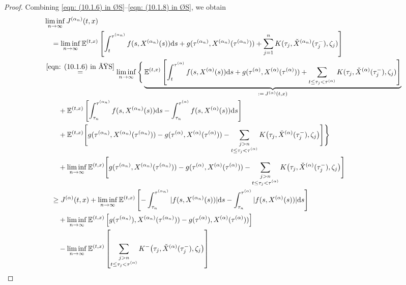 \begin{proof}
    Combining \eqref{eqn: (10.1.6) in ØS}--\eqref{eqn: (10.1.8) in ØS}, we obtain
    \begin{align}
        & \liminf_{n \rightarrow \infty} J^{(\alpha_n)}(t,x) \nonumber \\
        & \quad = \liminf_{n \rightarrow \infty} \E^{(t,x)} \left[ \int_t^{\tau^{(\alpha_n)}} f(s,X^{(\alpha_n)}(s)) \diff s + g(\tau^{(\alpha_n)},X^{(\alpha_n)}(\tau^{(\alpha_n)})) + \sum_{j=1}^n K(\tau_j,\check{X}^{(\alpha_n)}(\tau_j^-), \zeta_j) \right] \nonumber \\
        & \overset{\eqref{eqn: (10.1.6) in ØS}}{=} \liminf_{n \rightarrow \infty} \Bigg\{ \underbrace{\E^{(t,x)} \left[ \int_{t}^{\tau^{(\alpha)}} f(s,X^{(\alpha)}(s)) \diff s + g(\tau^{(\alpha)},\Xa(\tau^{(\alpha)})) + \sum_{t \leq \tau_j < \tau^{(\alpha)}} K(\tau_j,\check{X}^{(\alpha)}(\tau_j^-),\zeta_j) \right]}_{:=\, J^{(\alpha)}(t,x)} \nonumber \\
        & \qquad + \E^{(t,x)} \left[ \int_{\tau_n}^{\tau^{(\alpha_n)}} f(s,X^{(\alpha_n)}(s)) \diff s - \int_{\tau_n}^{\tau^{(\alpha)}} f(s,X^{(\alpha)}(s)) \diff s \right] \nonumber \\
        & \qquad + \E^{(t,x)}\Bigg[g(\tau^{(\alpha_n)},X^{(\alpha_n)}(\tau^{(\alpha_n)})) - g(\tau^{(\alpha)},\Xa(\tau^{(\alpha)})) -\sum_{\substack{j > n \\ t \leq \tau_j < \tau^{(\alpha)}}} K\big(\tau_j, \check{X}^{(\alpha)}(\tau_j^-),\zeta_j \big) \Bigg] \Bigg\} \nonumber \\
        & \qquad + \liminf_{n \rightarrow \infty} \E^{(t,x)}\Bigg[g(\tau^{(\alpha_n)},X^{(\alpha_n)}(\tau^{(\alpha_n)})) - g(\tau^{(\alpha)},\Xa(\tau^{(\alpha)})) -\sum_{\substack{j > n \\ t\leq \tau_j < \tau^{(\alpha)}}} K\big(\tau_j, \check{X}^{(\alpha)}(\tau_j^-),\zeta_j \big) \Bigg]  \nonumber \\
        & \quad \geq J^{(\alpha)}(t,x) + \liminf_{n \rightarrow \infty}  \E^{(t,x)} \left[ -\int_{\tau_n}^{\tau^{(\alpha_n)}} |f(s,X^{(\alpha_n)}(s))| \diff s - \int_{\tau_n}^{\tau^{(\alpha)}}|f(s,X^{(\alpha)}(s))| \diff s \right] \nonumber \\
        & \qquad + \liminf_{n \rightarrow \infty} \E^{(t,x)}\left[g(\tau^{(\alpha_n)}),X^{(\alpha_n)}(\tau^{(\alpha_n)})) - g(\tau^{(\alpha)}),\Xa(\tau^{(\alpha)}))\right] \nonumber \\
        & \qquad - \liminf_{n \rightarrow \infty}  \Etx \left[\sum_{\substack{j > n \\ t \leq \tau_j < \tau^{(\alpha)}}} K^-\big(\tau_j, \check{X}^{(\alpha)}(\tau_j^-),\zeta_j \big)\right]  \nonumber \\

\end{align}
\end{proof}
